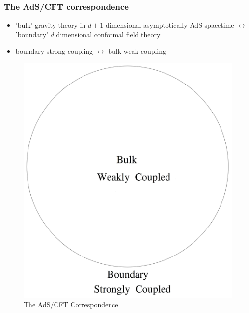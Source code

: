 \documentclass[10pt,aspectratio=169]{beamer}
\begin{document}
\begin{frame}
\frametitle{The AdS/CFT correspondence}

\begin{minipage}[t]{0.48\linewidth}

\begin{itemize}

\item 'bulk' gravity theory in $d+1$ dimensional  asymptotically AdS spacetime $\leftrightarrow$ 'boundary' $d$ dimensional conformal field theory

\item boundary strong coupling $\leftrightarrow$ bulk weak coupling

\end{itemize}

\end{minipage}
%
\hfill
%
\begin{minipage}[t]{0.48\linewidth}

\begin{figure}
    \begin{center}
    
        \includegraphics[scale=0.06]{adscft2}    
    
    \end{center}
    \caption{The AdS/CFT Correspondence}
\end{figure}

\end{minipage}

\end{frame}
\end{document}
